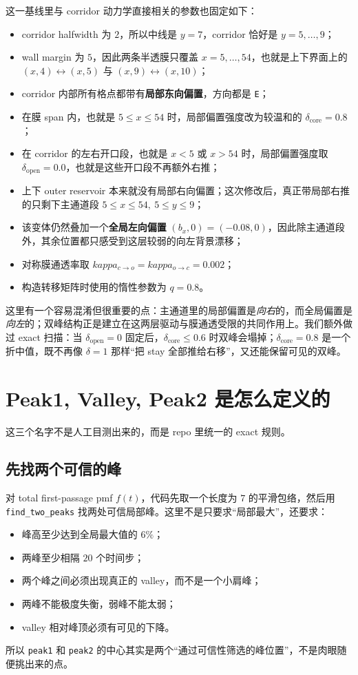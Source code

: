 \documentclass[11pt,fontset=fandol]{ctexart}
\begin{document}
这一基线里与 corridor 动力学直接相关的参数也固定如下：
\begin{itemize}
  \item corridor halfwidth 为 $2$，所以中线是 $y=7$，corridor 恰好是 $y=5,\dots,9$；
  \item wall margin 为 $5$，因此两条半透膜只覆盖 $x=5,\dots,54$，也就是上下界面上的 $(x,4)\leftrightarrow(x,5)$ 与 $(x,9)\leftrightarrow(x,10)$；
  \item corridor 内部所有格点都带有\textbf{局部东向偏置}，方向都是 \texttt{E}；
  \item 在膜 span 内，也就是 $5 \le x \le 54$ 时，局部偏置强度改为较温和的 $\delta_{\mathrm{core}}=0.8$；
  \item 在 corridor 的左右开口段，也就是 $x<5$ 或 $x>54$ 时，局部偏置强度取 $\delta_{\mathrm{open}}=0.0$，也就是这些开口段不再额外右推；
  \item 上下 outer reservoir 本来就没有局部右向偏置；这次修改后，真正带局部右推的只剩下主通道段 $5 \le x \le 54,\ 5 \le y \le 9$；
  \item 该变体仍然叠加一个\textbf{全局左向偏置} $(b_x,0)=(-0.08,0)$，因此除主通道段外，其余位置都只感受到这层较弱的向左背景漂移；
  \item 对称膜通透率取 $kappa_{c\to o}=kappa_{o\to c}=0.002$；
  \item 构造转移矩阵时使用的惰性参数为 $q=0.8$。
\end{itemize}
这里有一个容易混淆但很重要的点：主通道里的局部偏置是\emph{向右}的，而全局偏置是\emph{向左}的；双峰结构正是建立在这两层驱动与膜通透受限的共同作用上。我们额外做过 exact 扫描：当 $\delta_{\mathrm{open}}=0$ 固定后，$\delta_{\mathrm{core}}\le 0.6$ 时双峰会塌掉；$\delta_{\mathrm{core}}=0.8$ 是一个折中值，既不再像 $\delta=1$ 那样“把 stay 全部推给右移”，又还能保留可见的双峰。

\section{Peak1, Valley, Peak2 是怎么定义的}
这三个名字不是人工目测出来的，而是 repo 里统一的 exact 规则。

\subsection{先找两个可信的峰}
对 total first-passage pmf \(f(t)\)，代码先取一个长度为 \(7\) 的平滑包络，然后用 \texttt{find\_two\_peaks} 找两处可信局部峰。这里不是只要求“局部最大”，还要求：
\begin{itemize}
  \item 峰高至少达到全局最大值的 \(6\%\)；
  \item 两峰至少相隔 \(20\) 个时间步；
  \item 两个峰之间必须出现真正的 valley，而不是一个小肩峰；
  \item 两峰不能极度失衡，弱峰不能太弱；
  \item valley 相对峰顶必须有可见的下降。
\end{itemize}
所以 \texttt{peak1} 和 \texttt{peak2} 的中心其实是两个“通过可信性筛选的峰位置”，不是肉眼随便挑出来的点。
\end{document}
